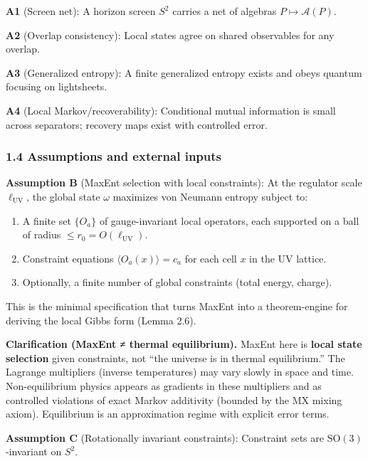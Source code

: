 \documentclass[11pt,a4paper]{article}
\theoremstyle{remark}
\providecommand{\tightlist}{%
  \setlength{\itemsep}{0pt}\setlength{\parskip}{0pt}}
\begin{document}
\textbf{A1} (Screen net): A horizon screen \(S^2\) carries a net of algebras \(P \mapsto \mathcal{A}(P)\).

\textbf{A2} (Overlap consistency): Local states agree on shared observables for any
overlap.

\textbf{A3} (Generalized entropy): A finite generalized entropy exists and obeys quantum
focusing on lightsheets.

\textbf{A4} (Local Markov/recoverability): Conditional mutual information is small
across separators; recovery maps exist with controlled error.

\subsubsection{1.4 Assumptions and external inputs}\label{assumptions-and-external-inputs}

\textbf{Assumption B} (MaxEnt selection with local constraints): At the regulator scale
\(\ell_{\mathrm{UV}}\), the global state \(\omega\) maximizes von Neumann entropy subject to:

\begin{enumerate}
\def\labelenumi{\arabic{enumi}.}
\tightlist
\item
  A finite set \(\{O_a\}\) of gauge-invariant local operators, each supported on a
  ball of radius \(\le r_0 = O(\ell_{\mathrm{UV}})\).
\item
  Constraint equations \(\langle O_a(x) \rangle = c_a\) for each cell \(x\) in the
  UV lattice.
\item
  Optionally, a finite number of global constraints (total energy, charge).
\end{enumerate}

This is the minimal specification that turns MaxEnt into a theorem-engine for
deriving the local Gibbs form (Lemma 2.6).

\textbf{Clarification (MaxEnt ≠ thermal equilibrium).} MaxEnt here is \textbf{local state
selection} given constraints, not ``the universe is in thermal equilibrium.''
The Lagrange multipliers (inverse temperatures) may vary slowly in space and
time. Non-equilibrium physics appears as gradients in these multipliers and as
controlled violations of exact Markov additivity (bounded by the MX mixing
axiom). Equilibrium is an approximation regime with explicit error terms.

\textbf{Assumption C} (Rotationally invariant constraints): Constraint sets are \(\mathrm{SO}(3)\)-invariant on \(S^2\).
\end{document}
